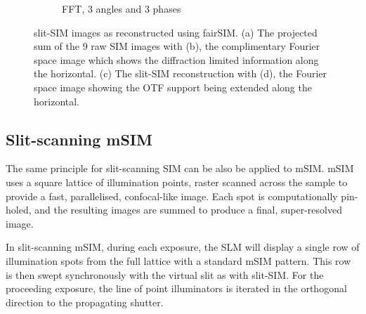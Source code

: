 \begin{figure}[h]
\begin{subfigure}[t]{0.23\textwidth}
      \caption{\gls{FFT}, 3 angles and 3 phases}
  \end{subfigure}
  \caption{slit-SIM images as reconstructed using fairSIM.
  (a) The projected sum of the 9 raw \gls{SIM} images with
  (b), the complimentary Fourier space image which shows the diffraction limited information along the horizontal.
  (c) The slit-SIM reconstruction with (d), the Fourier space image showing the OTF support being extended along the horizontal.
  }\label{fig:sim_slit_reconstructed}
\end{figure}

\subsection{Slit-scanning \gls{mSIM}}

The same principle for \gls{slit-scanning} \gls{SIM} can be also be applied to \gls{mSIM}.
\gls{mSIM} uses a square lattice of illumination points, raster scanned across the sample to provide a fast, parallelised, confocal-like image.
Each spot is computationally pin-holed, and the resulting images are summed to produce a final, super-resolved image.

In \gls{slit-scanning} \gls{mSIM}, during each exposure, the \gls{SLM} will display a single row of illumination spots from the full lattice with a standard \gls{mSIM} pattern.
This row is then swept synchronously with the virtual slit as with slit-\gls{SIM}.
For the proceeding exposure, the line of point illuminators is iterated in the orthogonal direction to the propagating shutter.

